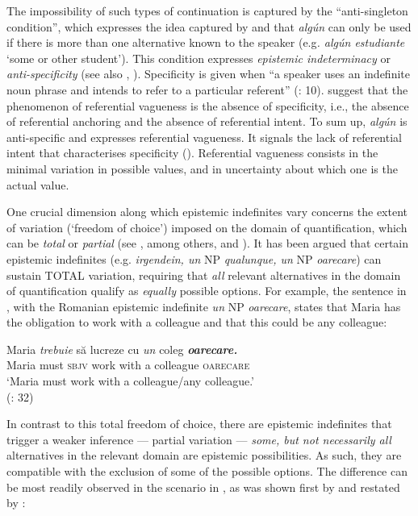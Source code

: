 The impossibility of such types of continuation is captured by the “anti-singleton condition”, which expresses the idea captured by \citet{Alonso-OvalleMenéndez-Benito2011} and \citet{GiannakidouQuer2013} that \textit{algún} can only be used if there is more than one alternative known to the speaker (e.g\textit{. algún estudiante} ‘some or other student’). This condition expresses \textit{epistemic indeterminacy} or \textit{anti-specificity} (see also \citealt{GiannakidouQuer2013}, \citealt{Etxeberria2014}). Specificity is given when “a speaker uses an indefinite noun phrase and intends to refer to a particular referent” (\citealt{vonHeusinger2011}: 10). \citet{GiannakidouQuer2013} suggest that the phenomenon of referential vagueness is the absence of specificity, i.e., the absence of referential anchoring and the absence of referential intent. To sum up, \textit{algún} is anti-specific and expresses referential vagueness. It signals the lack of referential intent that characterises specificity (\citealt{vonHeusinger2002,vonHeusinger2007,vonHeusinger2011}). Referential vagueness consists in the minimal variation in possible values, and in uncertainty about which one is the actual value.

One crucial dimension along which epistemic indefinites vary concerns the extent of variation (‘freedom of choice’) imposed on the domain of quantification, which can be \textit{total} or \textit{partial} (see \citealt{Fălăuş2014}, among others, and ). It has been argued that certain epistemic indefinites (e.g. \textit{irgendein, un} NP \textit{qualunque, un} NP \textit{oarecare}) can sustain TOTAL variation, requiring that \textit{all} relevant alternatives in the domain of quantification qualify as \textit{equally} possible options. For example, the sentence in , with the Romanian epistemic indefinite \textit{un} NP \textit{oarecare}, states that Maria has the obligation to work with a colleague and that this could be any colleague:

\ea  %
\label{bkm:Ref533761905}  
    \gll Maria \textit{trebuie} să lucreze cu \textit{un} coleg \textbf{\textit{oarecare.}}\\
    Maria must \textsc{sbjv} work with a colleague \textsc{oarecare}\\
    \glt ‘Maria must work with a colleague/any colleague.’\\
    (\citealt{Fălăuş2014}: 32)
\z

In contrast to this total freedom of choice, there are epistemic indefinites that trigger a weaker inference — partial variation — \textit{some, but not necessarily all} alternatives in the relevant domain are epistemic possibilities. As such, they are compatible with the exclusion of some of the possible options. The difference can be most readily observed in the scenario in , as was shown first by \citet{Menéndez-Benito2010} and restated by \citet{Fălăuş2014}:

